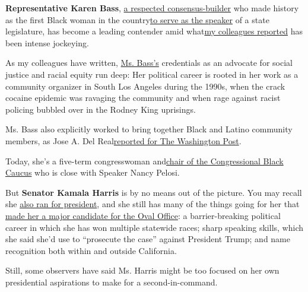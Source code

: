 \textbf{Representative Karen Bass},
\href{https://www.nytimes.com/2020/06/10/us/politics/karen-bass.html}{a
respected consensus-builder} who made history as the first Black woman
in the
country\href{https://www.washingtonpost.com/politics/rep-karen-bass-fought-for-blacks-and-latinos-in-south-los-angeles-now-shes-on-bidens-vp-shortlist/2020/07/31/6d224a58-d1d3-11ea-8c55-61e7fa5e82ab_story.html?hpid=hp_hp-more-top-stories-2_vpkarenbass-1135am\%3Ahomepage\%2Fstory-ans}{to
serve as the speaker} of a state legislature, has become a leading
contender amid
what\href{https://www.nytimes.com/2020/07/31/us/politics/joseph-biden-vice-president.html}{my
colleagues reported} has been intense jockeying.

As my colleagues have written,
\href{https://www.nytimes.com/2020/08/04/us/politics/karen-bass-vice-president-biden.html}{Ms.
Bass's} credentials as an advocate for social justice and racial equity
run deep: Her political career is rooted in her work as a community
organizer in South Los Angeles during the 1990s, when the crack cocaine
epidemic was ravaging the community and when rage against racist
policing bubbled over in the Rodney King uprisings.

Ms. Bass also explicitly worked to bring together Black and Latino
community members, as Jose A. Del
Real\href{https://www.washingtonpost.com/politics/rep-karen-bass-fought-for-blacks-and-latinos-in-south-los-angeles-now-shes-on-bidens-vp-shortlist/2020/07/31/6d224a58-d1d3-11ea-8c55-61e7fa5e82ab_story.html?hpid=hp_hp-more-top-stories-2_vpkarenbass-1135am\%3Ahomepage\%2Fstory-ans}{reported
for The Washington Post}.

Today, she's a five-term congresswoman
and\href{https://cbc.house.gov/about/about-the-chair.htm}{chair of the
Congressional Black Caucus} who is close with Speaker Nancy Pelosi.

But \textbf{Senator Kamala Harris} is by no means out of the picture.
You may recall she
\href{https://www.nytimes.com/2019/12/04/us/kamala-harris-drops-out.html}{also
ran for president}, and she still has many of the things going for her
that
\href{https://www.nytimes.com/interactive/2020/us/elections/kamala-harris.html}{made
her a major candidate for the Oval Office}: a barrier-breaking political
career in which she has won multiple statewide races; sharp speaking
skills, which she said she'd use to ``prosecute the case'' against
President Trump; and name recognition both within and outside
California.

Still, some observers have said Ms. Harris might be too focused on her
own presidential aspirations to make for a second-in-command.

